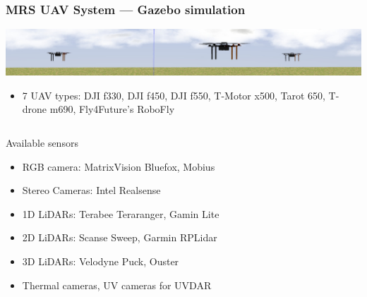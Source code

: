 \documentclass[aspectratio=169,9pt]{beamer}
\begin{document}








  \begin{frame}
    \frametitle{MRS UAV System --- Gazebo simulation}

    \vspace{-0.33em}

    \includegraphics[width=1.0\textwidth]{./fig/thumbnail_simulation.jpg}

    \vspace{-0.3em}

    \begin{itemize}
      \item 7 UAV types: DJI f330, DJI f450, DJI f550, T-Motor x500, Tarot 650, T-drone m690, Fly4Future's RoboFly
    \end{itemize}

    \begin{columns}[c]


      \begin{block}{Available sensors}
        \begin{itemize}
          \item RGB camera: MatrixVision Bluefox, Mobius
          \item Stereo Cameras: Intel Realsense
          \item 1D LiDARs: Terabee Teraranger, Gamin Lite
          \item 2D LiDARs: Scanse Sweep, Garmin RPLidar
          \item 3D LiDARs: Velodyne Puck, Ouster
          \item Thermal cameras, UV cameras for UVDAR
        \end{itemize}
      \end{block}


\end{columns}
\end{frame}
\end{document}
